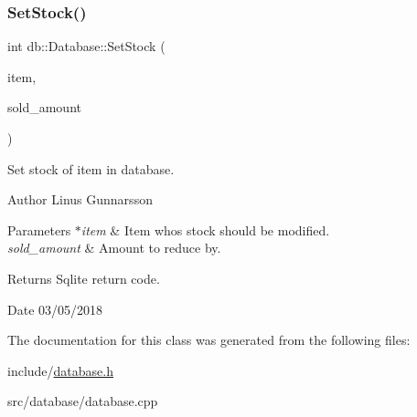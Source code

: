 \subsubsection{\texorpdfstring{Set\+Stock()}{SetStock()}}
{\footnotesize\ttfamily int db\+::\+Database\+::\+Set\+Stock (\begin{DoxyParamCaption}\item[{const \mbox{\hyperlink{classdb_1_1ItemDTO}{Item\+D\+TO}} $\ast$}]{item,  }\item[{int}]{sold\+\_\+amount }\end{DoxyParamCaption})}

Set stock of item in database. \begin{DoxyAuthor}{Author}
Linus Gunnarsson 
\end{DoxyAuthor}

\begin{DoxyParams}{Parameters}
{\em $\ast$item} & Item whos stock should be modified. \\
\hline
{\em sold\+\_\+amount} & Amount to reduce by. \\
\hline
\end{DoxyParams}
\begin{DoxyReturn}{Returns}
Sqlite return code. 
\end{DoxyReturn}
\begin{DoxyDate}{Date}
03/05/2018 
\end{DoxyDate}


The documentation for this class was generated from the following files\+:\begin{DoxyCompactItemize}
\item 
include/\mbox{\hyperlink{database_8h}{database.\+h}}\item 
src/database/database.\+cpp\end{DoxyCompactItemize}
